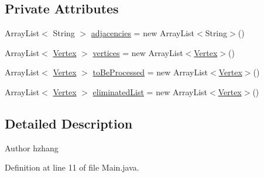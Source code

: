 \subsection*{Private Attributes}
\begin{DoxyCompactItemize}
\item 
Array\-List$<$ String $>$ \hyperlink{classmain_1_1java_1_1com_1_1company_1_1dijkstratest_1_1_main_a0d4996e719ec846ccd4be7d21cdfb2e5}{adjacencies} = new Array\-List$<$String$>$()
\item 
Array\-List$<$ \hyperlink{classmain_1_1java_1_1com_1_1company_1_1dijkstratest_1_1_vertex}{Vertex} $>$ \hyperlink{classmain_1_1java_1_1com_1_1company_1_1dijkstratest_1_1_main_a9e9e1529522bffb58584b4f319e07217}{vertices} = new Array\-List$<$\hyperlink{classmain_1_1java_1_1com_1_1company_1_1dijkstratest_1_1_vertex}{Vertex}$>$()
\item 
Array\-List$<$ \hyperlink{classmain_1_1java_1_1com_1_1company_1_1dijkstratest_1_1_vertex}{Vertex} $>$ \hyperlink{classmain_1_1java_1_1com_1_1company_1_1dijkstratest_1_1_main_a557eccaa4afe7d83cf6cc262d1ba1f3d}{to\-Be\-Processed} = new Array\-List$<$\hyperlink{classmain_1_1java_1_1com_1_1company_1_1dijkstratest_1_1_vertex}{Vertex}$>$()
\item 
Array\-List$<$ \hyperlink{classmain_1_1java_1_1com_1_1company_1_1dijkstratest_1_1_vertex}{Vertex} $>$ \hyperlink{classmain_1_1java_1_1com_1_1company_1_1dijkstratest_1_1_main_af031de92d898217502e31dcd4d6c9539}{eliminated\-List} = new Array\-List$<$\hyperlink{classmain_1_1java_1_1com_1_1company_1_1dijkstratest_1_1_vertex}{Vertex}$>$()
\end{DoxyCompactItemize}


\subsection{Detailed Description}
\begin{DoxyAuthor}{Author}
hzhang 
\end{DoxyAuthor}


Definition at line 11 of file Main.\-java.



